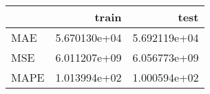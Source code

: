 \begin{tabular}{lrr}
\toprule
{} &         train &          test \\
\midrule
MAE  &  5.670130e+04 &  5.692119e+04 \\
MSE  &  6.011207e+09 &  6.056773e+09 \\
MAPE &  1.013994e+02 &  1.000594e+02 \\
\bottomrule
\end{tabular}
